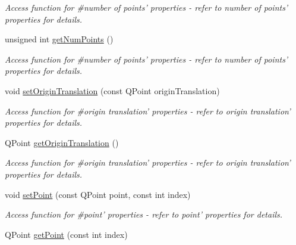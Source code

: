 \begin{DoxyCompactItemize}
\begin{DoxyCompactList}\small\item\em Access function for \#number of points' properties -\/ refer to number of points' properties for details. \end{DoxyCompactList}\item 
\hypertarget{classQEShape_a54af425f61c9d3967077657b8ef23c9f}{
unsigned int \hyperlink{classQEShape_a54af425f61c9d3967077657b8ef23c9f}{getNumPoints} ()}
\label{classQEShape_a54af425f61c9d3967077657b8ef23c9f}

\begin{DoxyCompactList}\small\item\em Access function for \#number of points' properties -\/ refer to number of points' properties for details. \end{DoxyCompactList}\item 
\hypertarget{classQEShape_a14925eb45989dbaea527b3827ed5a4f0}{
void \hyperlink{classQEShape_a14925eb45989dbaea527b3827ed5a4f0}{setOriginTranslation} (const QPoint originTranslation)}
\label{classQEShape_a14925eb45989dbaea527b3827ed5a4f0}

\begin{DoxyCompactList}\small\item\em Access function for \#origin translation' properties -\/ refer to origin translation' properties for details. \end{DoxyCompactList}\item 
\hypertarget{classQEShape_aaf48c52b8c07a444bf58c8f20bd94518}{
QPoint \hyperlink{classQEShape_aaf48c52b8c07a444bf58c8f20bd94518}{getOriginTranslation} ()}
\label{classQEShape_aaf48c52b8c07a444bf58c8f20bd94518}

\begin{DoxyCompactList}\small\item\em Access function for \#origin translation' properties -\/ refer to origin translation' properties for details. \end{DoxyCompactList}\item 
\hypertarget{classQEShape_a99367c2096e1b4ed34a114bd33c73d2c}{
void \hyperlink{classQEShape_a99367c2096e1b4ed34a114bd33c73d2c}{setPoint} (const QPoint point, const int index)}
\label{classQEShape_a99367c2096e1b4ed34a114bd33c73d2c}

\begin{DoxyCompactList}\small\item\em Access function for \#point' properties -\/ refer to point' properties for details. \end{DoxyCompactList}\item 
\hypertarget{classQEShape_acd197766b99fa9a43d9ff98517def2a5}{
QPoint \hyperlink{classQEShape_acd197766b99fa9a43d9ff98517def2a5}{getPoint} (const int index)}
\label{classQEShape_acd197766b99fa9a43d9ff98517def2a5}


\end{DoxyCompactItemize}
